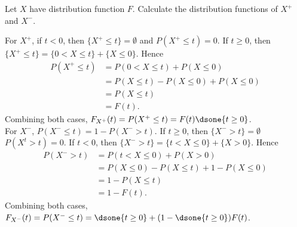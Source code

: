 \begin{exercise}
  Let $X$ have distribution function $F$. Calculate the distribution functions of $X^+$ and $X^-$.
\end{exercise}
\begin{solution}
  For $X^+$, if $t<0$, then $\{X^+\leq t\}=\emptyset$ and $P(X^+\leq t)=0$. If $t\geq 0$, then $\{X^+\leq t\} = \{0<X\leq t\}+\{X\leq 0\}$. Hence
  \begin{align*}
    P(X^+\leq t) &= P(0<X\leq t) + P(X\leq 0) \\
      &= P(X\leq t) - P(X\leq 0) + P(X\leq 0) \\
      &= P(X\leq t) \\
      &= F(t) .
  \end{align*}
  Combining both cases, $F_{X^+}(t)=P(X^+\leq t) = F(t)\dsone\{t\geq 0\}$. \\

  For $X^-$, $P(X^-\leq t) = 1 - P(X^->t)$. If $t\geq 0$, then $\{X^->t\}=\emptyset$ $P(X^t>t) = 0$. If $t<0$, then $\{X^->t\} = \{t<X\leq 0\}+\{X>0\}$. Hence
  \begin{align*}
    P(X^->t) &= P(t<X\leq 0) + P(X> 0) \\
      &= P(X\leq 0) - P(X\leq t) + 1 - P(X\leq 0) \\
      &= 1 - P(X\leq t) \\
      &= 1 - F(t) .
  \end{align*}
  Combining both cases, $F_{X^-}(t)=P(X^-\leq t) = \dsone\{t\geq 0\} + (1-\dsone\{t\geq 0\})F(t)$.
\end{solution}


